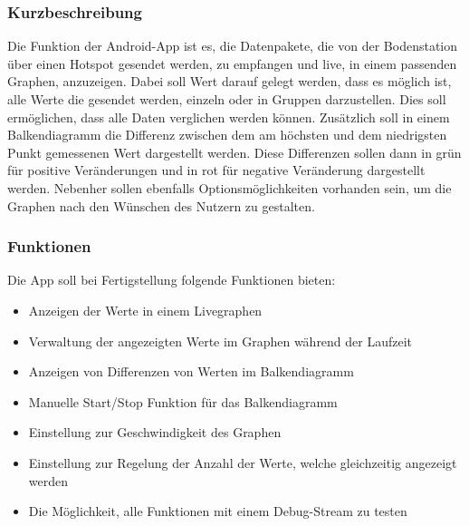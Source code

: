 \subsubsection{Kurzbeschreibung}
Die Funktion der Android-App ist es, die Datenpakete, die von der Bodenstation über einen Hotspot gesendet werden, zu empfangen und live, in einem passenden Graphen, anzuzeigen. Dabei soll Wert darauf gelegt werden, dass es möglich ist, alle Werte die gesendet werden, einzeln oder in Gruppen darzustellen. Dies soll ermöglichen, dass alle Daten verglichen werden können. Zusätzlich soll in einem Balkendiagramm die Differenz zwischen dem am höchsten und dem niedrigsten Punkt gemessenen Wert dargestellt werden. Diese Differenzen sollen dann in grün für positive Veränderungen und in rot für negative Veränderung dargestellt werden. Nebenher sollen ebenfalls Optionsmöglichkeiten vorhanden sein, um die Graphen nach den Wünschen des Nutzern zu gestalten.

\subsubsection{Funktionen}
Die App soll bei Fertigstellung folgende Funktionen bieten:
\begin{itemize}
	\item Anzeigen der Werte in einem Livegraphen
	\item Verwaltung der angezeigten Werte im Graphen während der Laufzeit
	\item Anzeigen von Differenzen von Werten im Balkendiagramm
	\item Manuelle Start/Stop Funktion für das Balkendiagramm
	\item Einstellung zur Geschwindigkeit des Graphen
	\item Einstellung zur Regelung der Anzahl der Werte, welche gleichzeitig angezeigt werden
	\item Die Möglichkeit, alle Funktionen mit einem Debug-Stream zu testen
\end{itemize}
